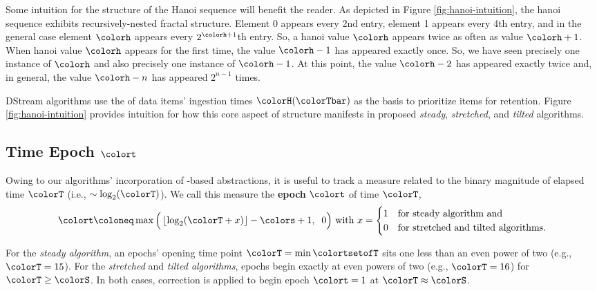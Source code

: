 Some intuition for the structure of the Hanoi sequence will benefit the reader.
As depicted in Figure \ref{fig:hanoi-intuition}, the hanoi sequence exhibits recursively-nested fractal structure.
Element 0 appears every 2nd entry, element 1 appears every 4th entry, and in the general case element $\colorh$ appears every $2^{\colorh+1}$th entry.
So, a hanoi value $\colorh$ appears twice as often as value $\colorh + 1$.
When hanoi value $\colorh$ appears for the first time, the value $\colorh - 1$ has appeared exactly once.
So, we have seen precisely one instance of $\colorh$ and also precisely one instance of $\colorh - 1$.
At this point, the value $\colorh - 2$ has appeared exactly twice and, in general, the value $\colorh - n$ has appeared $2^{n - 1}$ times.

DStream algorithms use the \hv{} of data items' ingestion times $\colorH(\colorTbar)$ as the basis to prioritize items for retention.
Figure \ref{fig:hanoi-intuition} provides intuition for how this core aspect of structure manifests in proposed \textit{steady}, \textit{stretched}, and \textit{tilted} algorithms.



\subsection{Time Epoch $\colort$}
\label{sec:notation-epoch}

Owing to our algorithms' incorporation of \hv{}-based abstractions, it is useful to track a measure related to the binary magnitude of elapsed time $\colorT$ (i.e., $\sim \log_2(\colorT)$).
We call this measure the \textbf{epoch} $\colort$ of time $\colorT$,
\begin{equation}
\colort
\coloneq
\max\Big(\left\lfloor \log_2(\colorT+x) \right\rfloor - \colors + 1,\;\; 0\Big)
\text{ with }
x =
\begin{cases}
1 & \text{for steady algorithm and} \\
0 & \text{for stretched and tilted algorithms.}
\end{cases}
\label{eqn:epoch-defn}
\end{equation}

For the \textit{steady algorithm}, an epochs' opening time point $\colorT = \min\colortsetofT$  sits one less than an even power of two (e.g.,  $\colorT = 15$).
For the \textit{stretched} and \textit{tilted algorithms}, epochs begin exactly at even powers of two (e.g., $\colorT = 16$) for $\colorT \geq \colorS$.
In both cases, correction is applied to begin epoch $\colort=1$ at $\colorT \approx \colorS$.


